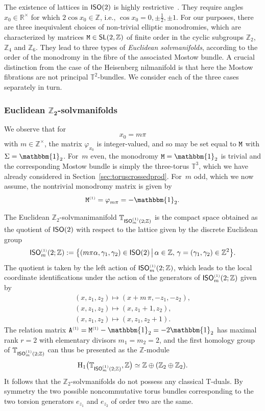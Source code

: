\documentclass[pdftex]{sigma}
\numberwithin{equation}{section}
\newcommand{\Z}{\zed}
\newcommand{\unit}{\mathbbm{1}} 			%
\newcommand{\sfSL}{\mathsf{SL}}
\newcommand{\rmH}{{\rm H}}
\newcommand{\ISO}{{\sf ISO}}
\newcommand{\R}{\real}
\newcommand{\zed}{{\mathbb Z}} %
\newcommand{\real}{{\mathbb R}} %
\newcommand{\torus}{{\mathbb T}} %
\begin{document}
The existence of lattices in $\ISO(2)$ is highly
restrictive~\cite{Hull2005,Hull2019}. They require angles
$x_0\in\R^\times$ for which $2\cos x_0\in\Z$, i.e., $\cos
x_0=0,\pm\frac12,\pm1$. For our purposes, there are three
inequivalent choices of non-trivial elliptic monodromies,
which are characterized by matrices ${\tt M}\in\sfSL(2,\Z)$ of finite
order in the cyclic subgroups $\Z_2$, $\Z_4$ and $\Z_6$. They lead to three
types of \emph{Euclidean solvmanifolds}, according to the order of the monodromy in the fibre of the
associated Mostow bundle. A crucial distinction from the case of the
Heisenberg nilmanifold is that here the Mostow fibrations are not
principal $\torus^2$-bundles.
We consider each of the three cases
separately in turn.

\subsubsection*{Euclidean $\boldsymbol{\Z_2}$-solvmanifolds}

We observe that for
\[
x_0 = m \pi
\]
with $m\in\Z^\times$, the matrix $\varphi_{x_0}$ is integer-valued, and so
may be set equal to $\tt M$ with $\Sigma=\unit_2$. For~$m$ even, the
monodromy ${\tt M}=\unit_2$ is trivial and the corresponding
Mostow bundle is simply the three-torus $\torus^3$, which we have
already considered in Section~\ref{sec:toruscrossedprod}. For~$m$ odd,
which we now assume,
the nontrivial monodromy matrix is given by
\begin{gather}\label{eq:mon1}
{\tt M}^{\text{\tiny(1)}} = \varphi^{\phantom{\dag}}_{m \pi} = -\unit_2 .
\end{gather}

The Euclidean
$\Z_2$-solvmanimanifold $\torus_{\ISO_m ^{\text{\tiny(1)}} (2;\Z)}$ is the compact
space obtained as the quotient of $\ISO(2)$ with
respect to the lattice given by the discrete Euclidean group
\[
\ISO ^{\text{\tiny(1)}}_m(2;\Z) := \big\{ (m \pi \alpha,\gamma_1,\gamma_2)\in\ISO(2) \,
\big| \, \alpha\in\Z , \, \gamma=(\gamma_1,\gamma_2)\in\Z^2 \big\} .
\]
The quotient is taken by the left action of
$\ISO ^{\text{\tiny(1)}}_m(2;\Z)$, which leads
to the local coordinate identifications under the action of the
generators of $\ISO ^{\text{\tiny(1)}}_m(2;\Z)$ given by
\begin{gather*}
(x,z_1,z_2) \longmapsto (x+m\,\pi,-z_1,-z_2) , \nonumber \\
(x,z_1,z_2) \longmapsto (x,z_1+1,z_2) , \nonumber \\
(x,z_1,z_2) \longmapsto (x,z_1,z_2+1) .%
\end{gather*}
The relation matrix $
{\tt A}^{\text{\tiny(1)}} = {\tt M}^{\text{\tiny(1)}}-\unit_2 = -2\unit_2$ has maximal rank $r=2$ with elementary divisors
$m_1=m_2=2$, and
the first homology group of
$\torus_{\ISO ^{\text{\tiny(1)}}_m(2;\Z)}$ can thus be presented as the $\Z$-module
\[
\rmH_1\big(\torus_{\ISO ^{\text{\tiny(1)}}_m(2;\Z)},\Z\big) \simeq
\Z\oplus(\Z_2\oplus\Z_2) .
\]
It follows that the $\Z_2$-solvmanifolds do not possess any classical
T-duals. By symmetry the two possible noncommutative torus bundles
corresponding to the two torsion generators $e_{z_1}$ and $e_{z_2}$ of
order two are the same.
\end{document}
